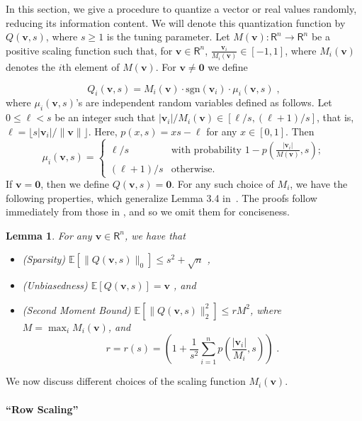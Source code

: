 \documentclass{article}
\newcommand{\R}{\mathsf{R}}
\newcommand{\sgn}[1]{\mbox{sgn}(#1)}
\renewcommand{\vec}[1]{\mathbf{#1}}
\def\E{\mathbb{E}}
\newtheorem{lemma}{Lemma}
\begin{document}
In this section, we give a procedure to quantize a vector or real values randomly, reducing its information content. We will denote this quantization function by $Q(\vec{v},s)$, where $s\geq 1$ is the tuning parameter. 
Let $M(\vec{v}): \R^n \rightarrow \R^n$ be a positive scaling function such that, for $\vec{v}\in \R^n$, $\frac{\vec{v}_i}{M_i(\vec{v})} \in [-1, 1]$, where $M_i(\vec{v})$ denotes the $i$th element of $M(\vec{v})$.
For $\vec{v} \neq \vec{0}$ we define

\begin{equation}
Q_i(\vec{v},s) = M_i(\vec{v}) \cdot \sgn{\vec{v}_i} \cdot \mu_i(\vec{v},s) \; , \label{equ:quant2}
\end{equation}
where $\mu_i(\vec{v},s)$'s are independent random variables defined as follows. 
Let $0 \leq \ell < s$ be an integer such that $|\vec{v}_i|/M_i(\vec{v}) \in [ \ell / s, (\ell + 1) / s ]$, that is, $\ell = \lfloor s |\vec{v}_i|/\| \vec{v} \| \rfloor$. 
Here, $p(x,s) = x s - \ell$ for any $x \in [0,1]$.
Then 
\[
\mu_i(\vec{v},s) = \left\{ \begin{array}{ll}
         \ell / s & \mbox{with probability $1 - p\left(\frac{|\vec{v}_i|}{M(\vec{v})},s\right)$};\\
         (\ell + 1) / s & \mbox{otherwise}. \end{array} \right.
\]
If $\vec{v} = \vec{0}$, then we define $Q(\vec{v},s) = \vec{0}$.
For any such choice of $M_i$, we have the following properties, which generalize Lemma 3.4 in~\cite{QSGD}.
The proofs follow immediately from those in \cite{QSGD}, and so we omit them for conciseness.
\begin{lemma}
\label{lem:quant-facts}
 For any $\vec{v} \in \R^n$, we have that 
 \begin{itemize} 
 \item (Sparsity) $\E[ \|Q(\vec{v}, s)\|_0]\leq
 s^2 +\sqrt{n}$ , 
 \item (Unbiasedness) $\E [Q (\vec{v},s)] = \vec{v}$ , and
 \item (Second Moment Bound) 
$\E [\| Q (\vec{v},s) \|_2^2] \leq r M^2$, where $M = \max_i M_i (\vec{v})$, and 
\[
r = r(s) = \left( 1 + \frac{1}{s^2} \sum_{i = 1}^n p\left( \frac{|\vec{v}_i|}{M_i },s \right) \right) \; .
\]
 \end{itemize}
\end{lemma}


We now discuss different choices of the scaling function $M_i(\vec{v})$.

\paragraph*{``Row Scaling''}
\end{document}
